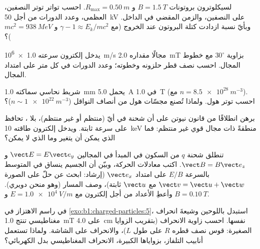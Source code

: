 \begin{exercise}[$\star\star$]\label{exo:b1:charged-particles:7}
لسيكلوترون بروتونات $B = \qty{1.5}{T}$ و $R_{\max} = \qty{0.50}{m}$.
احسب تواتر توتر النصفين،  العظمى، وعدد الدورات
من أجل \qty{50}{kV} على النصفين، والزمن المقضي في الداخل. وبأيّ نسبة
ازدادت كتلة البروتون عند الخروج (مع $\gamma - 1 \approx E_k/mc^2$ و
$mc^2 = \qty{938}{MeV}$)؟
\end{exercise}

\begin{exercise}[$\star\star$]\label{exo:b1:charged-particles:8}
يدخل إلكترون سرعته \qty{1.0e6}{m/s} مجالًا مقداره \qty{2.0}{mT} بزاوية $30^\circ$
مع خطوط المجال. احسب نصف قطر حلزونه وخطوته؛ وعدد الدورات في كل
متر على امتداد المجال.
\end{exercise}

\begin{exercise}[$\star\star$]\label{exo:b1:charged-particles:9}
شريط نحاسي سماكته \qty{1.0}{mm} يحمل \qty{5.0}{A} في \qty{1.0}{T}
(مع $n = \qty{8.5e28}{m^{-3}}$). احسب توتر هول. ولماذا تُصنع مجسّات هول من
أنصاف النواقل ($n \sim \qty{1e22}{m^{-3}}$)؟
\end{exercise}

\begin{exercise}[$\star\star\star$]\label{exo:b1:charged-particles:10}
برهن انطلاقًا من قانون نيوتن على أن شحنة في أيّ  (منتظم أو
غير منتظم)، بلا ، تحافظ على سرعة ثابتة. ويدخل إلكترون طاقته \qty{10}{keV}
منطقةً ذات مجال قوي غير منتظم: فما الذي يمكن أن يتغير وما الذي
لا يمكن؟
\end{exercise}

\begin{exercise}[$\star\star\star$]\label{exo:b1:charged-particles:11}
تنطلق شحنة $q$ من السكون في المبدأ في المجالين $\vect E = E\vect e_y$ و
$\vect B = B\vect e_z$. اكتب معادلات الحركة، وبيّن أن
الجسيم ينساق في المتوسط بالسرعة $E/B$ على امتداد $\vect e_x$
(إرشاد: ابحث عن حلّ على الصورة $\vect v = \vect u + \vect w$ مع
$\vect u$ ثابتة)، وصف المسار (وهو منحن دويري). وأعطِ الأعداد من أجل
إلكترون مع $E = \qty{1.0e4}{V/m}$ و $B = \qty{0.10}{T}$.
\end{exercise}

\begin{exercise}[$\star\star\star$]\label{exo:b1:charged-particles:12}
في راسم الاهتزاز في \cref{exo:b1:charged-particles:5}، استبدل
باللوحين وشيعةَ انحراف مغناطيسي تنتج \qty{1.0}{mT} على
\qty{4.0}{cm} نفسها. احسب زاوية الانحراف (بتقريب الزوايا الصغيرة: قوس نصف قطره $R$
على طول $L$)، والانحراف على الشاشة. ولماذا تستعمل أنابيب التلفاز،
بزواياها الكبيرة، الانحراف المغناطيسي بدل الكهربائي؟
\end{exercise}

